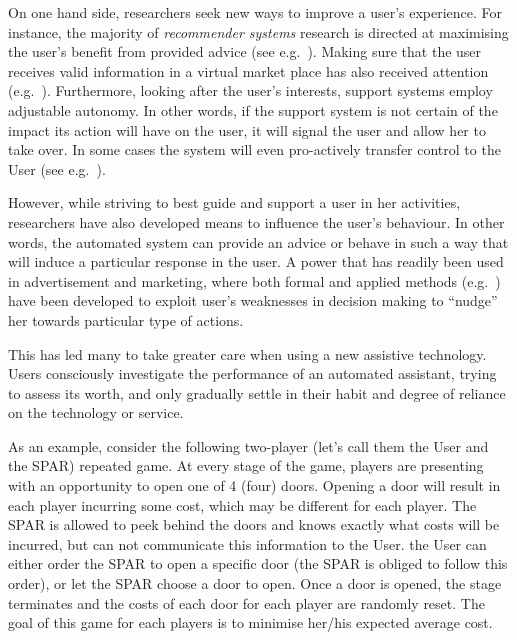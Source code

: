 \documentclass{msdm2012}
\begin{document}
On one hand side, researchers seek new ways to improve a user's
experience. For instance, the majority of {\em recommender systems}
research is directed at maximising the user's benefit from provided
advice (see e.g.~\cite{RS_handbook_2011}). Making sure that the user
receives valid information in a virtual market place has also received
attention (e.g.~\cite{thanasis_etal,
  zohar_rosenchein_2008}). Furthermore, looking after the user's
interests, support systems employ adjustable autonomy. In other words,
if the support system is not certain of the impact its action will
have on the user, it will signal the user and allow her to take
over. In some cases the system will even pro-actively transfer control
to the User (see e.g.~\cite{Schurr09a,
  sofman_bagnell_stentz_2009,mouaddib_etal_2010}).

However, while striving to best guide and support a user in her
activities, researchers have also developed means to influence the
user's behaviour. In other words, the automated system can provide an
advice or behave in such a way that will induce a particular response
in the user. A power that has readily been used in advertisement and
marketing, where both formal and applied methods
(e.g.~\cite{arkg_2011_aaai, rayo_segal_2010, kamenica_gentzkow_2010,
  Chorus2006b}) have been developed to exploit user's weaknesses in
decision making to ``nudge'' her towards particular type of actions.

This has led many to take greater care when using a new assistive
technology. Users consciously investigate the performance of an
automated assistant, trying to assess its worth, and only gradually
settle in their habit and degree of reliance on the technology or
service.

As an example, consider the following two-player (let's call them
the User and the SPAR) repeated game. At every stage of the game, players are
presenting with an opportunity to open one of 4 (four) doors. Opening
a door will result in each player incurring some cost, which may be
different for each player. The SPAR is allowed to peek behind the doors and
knows exactly what costs will be incurred, but can not communicate
this information to the User. the User can either order the SPAR to open a
specific door (the SPAR is obliged to follow this order), or let the SPAR choose
a door to open. Once a door is opened, the stage terminates and the
costs of each door for each player are randomly reset. The goal of
this game for each players is to minimise her/his expected average cost.
\end{document}
